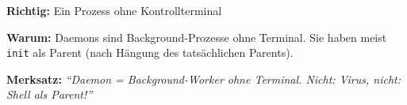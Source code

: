 \documentclass[a4paper,11pt]{article}
\begin{document}
\begin{tcolorbox}[colback=green!15!white,colframe=green!70!black,title=\textbf{Lösung Aufgabe 7f}]
\textbf{Richtig:} \checkmark Ein Prozess ohne Kontrollterminal

\textbf{Warum:} Daemons sind Background-Prozesse ohne Terminal. Sie haben meist \texttt{init} als Parent (nach Hängung des tatsächlichen Parents).

\textbf{Merksatz:} \textit{``Daemon = Background-Worker ohne Terminal. Nicht: Virus, nicht: Shell als Parent!''}
\end{tcolorbox}
\end{document}
